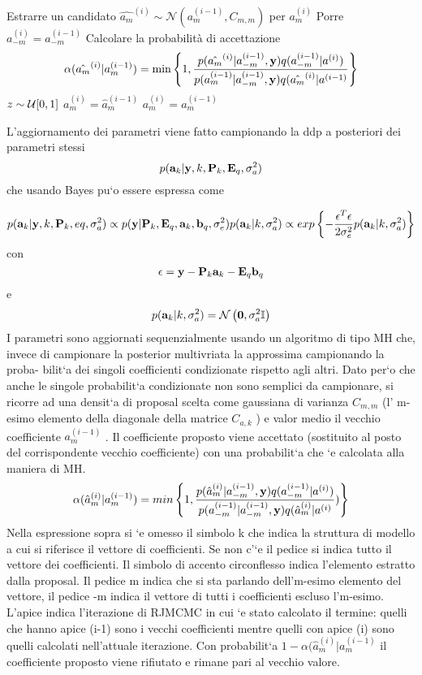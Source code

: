 \begin{algorithmic}
\State Estrarre un candidato $\hat{a_m}^{(i)}\sim\mathcal{N}(a_m^{(i-1)},C_{m,m})$ per $a_m^{(i)}$ 
\State Porre $a_{-m}^{(i)}=a_{-m}^{(i-1)}$
\State Calcolare la probabilità di accettazione
\[
\alpha(\hat{a_m}^{(i)}|a_m^{(i-1)})=\min\left\lbrace 1, \frac{p(\hat{a_m}^{(i)}|a_{-m}^{(i-1)},\textbf{y}) q(a_{-m}^{(i-1)}|a^{(i)})}{p(a_m^{(i-1)}|a_{-m}^{(i-1)},\textbf{y})q(\hat{a_m}^{(i)}|a^{(i-1)}} \right\rbrace
\]
\State $z\sim\mathcal{U}[0,1]$
\State $a_m^{(i)}=\hat{a}_m^{(i-1)}$
\Else $a_m^{(i)}=a_m^{(i-1)}$
\EndIf
\EndFor
\end{algorithmic}
L’aggiornamento dei parametri viene fatto campionando la ddp a posteriori dei
parametri stessi
\begin{equation}
p(\textbf{a}_k|\textbf{y},k,\textbf{P}_k,\textbf{E}_q,\sigma_a^2)
\end{equation}
che usando Bayes pu`o essere espressa come

\begin{equation}
p(\textbf{a}_k|\textbf{y},k,\textbf{P}_k,eq,\sigma_a^2)\propto p(\textbf{y}|\textbf{P}_k,\textbf{E}_q,\textbf{a}_k,\textbf{b}_q,\sigma_e^2)p(\textbf{a}_k|k,\sigma_a^2)\propto exp\left\lbrace- \frac{\epsilon^T\epsilon}{2\sigma_e^2}p(\textbf{a}_k|k,\sigma_a^2)\right\rbrace
\end{equation}
con
\begin{equation}
\epsilon=\textbf{y}-\textbf{P}_k\textbf{a}_k-\textbf{E}_q\textbf{b}_q
\end{equation}
e
\begin{equation}
p(\textbf{a}_k|k,\sigma_a^2)=\mathcal{N}\left(\textbf{0},\sigma_a^2 \mathbb{I}\right)
\end{equation}
I parametri sono aggiornati sequenzialmente usando un algoritmo di tipo MH che,
invece di campionare la posterior multivriata la approssima campionando la proba-
bilit`a dei singoli coefficienti condizionate rispetto agli altri. Dato per`o che anche le
singole probabilit`a condizionate non sono semplici da campionare, si ricorre ad una
densit`a di proposal scelta come gaussiana di varianza $C_{m,m}$ (l’ m-esimo elemento
della diagonale della matrice $C_{a,k}$ ) e valor medio il vecchio coefficiente $a_m^{(i-1)}$ . Il
coefficiente proposto viene accettato (sostituito al posto del corrispondente vecchio
coefficiente) con una probabilit`a che `e calcolata alla maniera di MH.
\begin{equation}
\alpha(\hat{a}_m^{(i)}|a_m^{(i-1)})=min\left\lbrace 1,\frac{p(\hat{a}_m^{(i)}|a_{-m}^{(i-1)},\textbf{y})q(a_{-m}^{(i-1)}|a^{(i)})}
{p(a_{-m}^{(i-1)}|a_{-m}^{(i-1)},\textbf{y})q(\hat{a}_m^{(i)}|a^{(i)}})\right\rbrace
\end{equation}
Nella espressione sopra si `e omesso il simbolo k che indica la struttura di modello a
cui si riferisce il vettore di coefficienti. Se non c’`e il pedice si indica tutto il vettore
dei coefficienti. Il simbolo di accento circonflesso indica l’elemento estratto dalla
proposal. Il pedice m indica che si sta parlando dell’m-esimo elemento del vettore,
il pedice -m indica il vettore di tutti i coefficienti escluso l’m-esimo. L’apice indica
l’iterazione di RJMCMC in cui `e stato calcolato il termine: quelli che hanno apice
(i-1) sono i vecchi coefficienti mentre quelli con apice (i) sono quelli calcolati
nell’attuale iterazione. Con probabilit`a $1-\alpha(\hat{a}_m^{(i)}|a_m^{(i-1)}$ il coefficiente proposto
viene rifiutato e rimane pari al vecchio valore.
